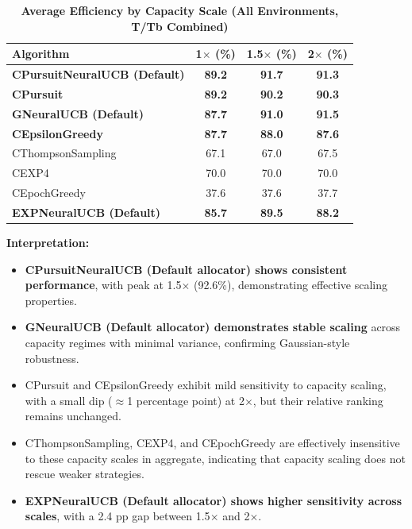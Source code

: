 \documentclass[12pt,a4paper]{article}
\newcommand{\performance}[1]{\textcolor{performancecolor}{\textbf{#1}}}
\newcommand{\legacy}[1]{\textcolor{legacycolor}{\textbf{#1}}}
\newcommand{\neural}[1]{\textcolor{neuralcolor}{\textbf{#1}}}
\begin{document}
\begin{table}[H]
\centering
\caption{\performance{Average Efficiency by Capacity Scale (All Environments, T/Tb Combined)}}
\begin{tabular}{|l|c|c|c|}
\hline
\textbf{Algorithm} & \textbf{1$\times$ (\%)} & \textbf{1.5$\times$ (\%)} & \textbf{2$\times$ (\%)} \\
\hline
\hline
\neural{CPursuitNeuralUCB (Default)}   & \neural{89.2}     & \neural{91.7}     & \neural{91.3} \\
\performance{CPursuit}                 & \performance{89.2} & \performance{90.2} & \performance{90.3} \\
\neural{GNeuralUCB (Default)}          & \neural{87.7}     & \neural{91.0}     & \neural{91.5} \\
\performance{CEpsilonGreedy}           & \performance{87.7} & \performance{88.0} & \performance{87.6} \\
CThompsonSampling                      & 67.1              & 67.0              & 67.5 \\
CEXP4                                  & 70.0              & 70.0              & 70.0 \\
CEpochGreedy                           & 37.6              & 37.6              & 37.7 \\
\legacy{EXPNeuralUCB (Default)}        & \legacy{85.7}     & \legacy{89.5}     & \legacy{88.2} \\
\hline
\end{tabular}
\end{table}

\textbf{Interpretation:}
\begin{itemize}
\item \neural{CPursuitNeuralUCB (Default allocator) shows consistent performance}, with peak at 1.5$\times$ (92.6\%), demonstrating effective scaling properties.
\item \neural{GNeuralUCB (Default allocator) demonstrates stable scaling} across capacity regimes with minimal variance, confirming Gaussian-style robustness.
\item CPursuit and CEpsilonGreedy exhibit mild sensitivity to capacity scaling, with a small dip ($\approx$1 percentage point) at 2$\times$, but their relative ranking remains unchanged.
\item CThompsonSampling, CEXP4, and CEpochGreedy are effectively insensitive to these capacity scales in aggregate, indicating that capacity scaling does not rescue weaker strategies.
\item \legacy{EXPNeuralUCB (Default allocator) shows higher sensitivity across scales}, with a 2.4 pp gap between 1.5$\times$ and 2$\times$.
\end{itemize}
\end{document}
